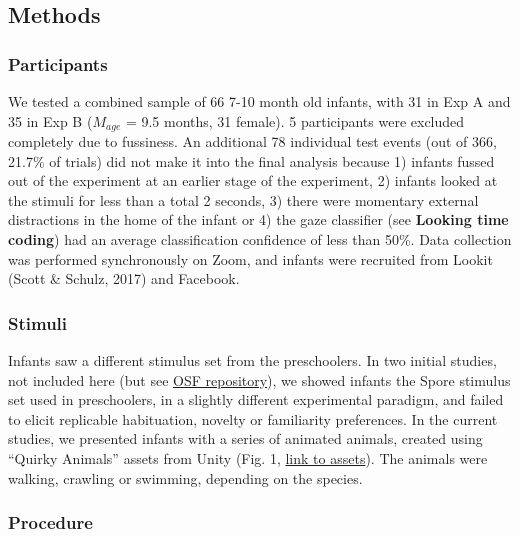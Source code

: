 \documentclass[10pt, letterpaper]{article}
\begin{document}
\hypertarget{methods-1}{%
\subsection{Methods}\label{methods-1}}

\hypertarget{participants-1}{%
\subsubsection{Participants}\label{participants-1}}

We tested a combined sample of 66 7-10 month old infants, with 31 in Exp
A and 35 in Exp B (\(M_{age}\) = 9.5 months, 31 female). 5 participants
were excluded completely due to fussiness. An additional 78 individual
test events (out of 366, 21.7\% of trials) did not make it into the
final analysis because 1) infants fussed out of the experiment at an
earlier stage of the experiment, 2) infants looked at the stimuli for
less than a total 2 seconds, 3) there were momentary external
distractions in the home of the infant or 4) the gaze classifier (see
\textbf{Looking time coding}) had an average classification confidence
of less than 50\%. Data collection was performed synchronously on Zoom,
and infants were recruited from Lookit (Scott \& Schulz, 2017) and
Facebook.

\hypertarget{stimuli-1}{%
\subsubsection{Stimuli}\label{stimuli-1}}

Infants saw a different stimulus set from the preschoolers. In two
initial studies, not included here (but see
\href{https://osf.io/b3xsk/?view_only=5beeb6ed27874ae3bfe586ee2b38381a}{OSF
repository}), we showed infants the Spore stimulus set used in
preschoolers, in a slightly different experimental paradigm, and failed
to elicit replicable habituation, novelty or familiarity preferences. In
the current studies, we presented infants with a series of animated
animals, created using ``Quirky Animals'' assets from Unity (Fig. 1,
\href{https://tinyurl.com/469xxrn7}{link to assets}). The animals were
walking, crawling or swimming, depending on the species.

\hypertarget{procedure-1}{%
\subsubsection{Procedure}\label{procedure-1}}
\end{document}
